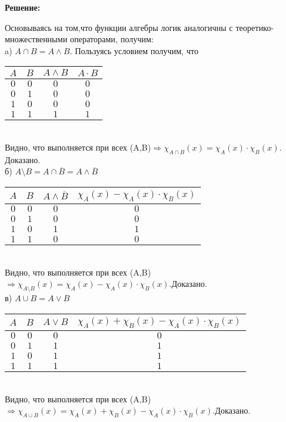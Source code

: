 \documentclass[a4paper,12pt]{article} %
\begin{document}
\begin{center}
\bfseries
{\Large Решение: }
\end{center}
Основываясь на том,что функции алгебры логик аналогичны с теоретико-множественными операторами, получим:\\
a) $A \cap B = A \wedge B.$ Пользуясь условием получим, что\\
\begin{tabular}{ | c | c | c | c |}
\hline
$A$ & $B$ & $A\wedge B$ & $A \cdot B$\\ \hline
$0$ & $0$ & $0$ & $0$\\
$0$ & $1$ & $0$ & $0$\\
$1$ & $0$ & $0$ & $0$\\
$1$ & $1$ & $1$ & $1$\\
\hline 
\end{tabular}\\
Видно, что выполняется при всех (A,B)$ \Rightarrow \chi_{A\cap B}(x) = \chi_{A}(x) \cdot \chi_{B}(x)$. Доказано.\\
б) $A \setminus B = A \cap \overline{B} = A \wedge \overline{B}$\\
\begin{tabular}{ | c | c | c | c |}
\hline
$A$ & $B$ & $ A \wedge \overline{B}$ & $\chi_{A}(x) - \chi_{A}(x) \cdot \chi_{B}(x)$\\ \hline
$0$ & $0$ & $0$ & $0$\\
$0$ & $1$ & $0$ & $0$\\
$1$ & $0$ & $1$ & $1$\\
$1$ & $1$ & $0$ & $0$\\
\hline 
\end{tabular}\\
Видно, что выполняется при всех (A,B)$ \Rightarrow \chi_{A\setminus B}(x) = \chi_{A}(x) - \chi_{A}(x) \cdot \chi_{B}(x).$Доказано.\\
в) $A \cup B = A \vee B$\\
\begin{tabular}{ | c | c | c | c |}
\hline
$A$ & $B$ & $A \vee B$ & $\chi_A(x) + \chi_{B}(x) - \chi_{A}(x)\cdot \chi_{B} (x)$\\ \hline
$0$ & $0$ & $0$ & $0$\\
$0$ & $1$ & $1$ & $1$\\
$1$ & $0$ & $1$ & $1$\\
$1$ & $1$ & $1$ & $1$\\
\hline 
\end{tabular}\\
Видно, что выполняется при всех (A,B)$ \Rightarrow \chi_{A\cup B}(x) = \chi_A(x) + \chi_{B}(x) - \chi_{A}(x)\cdot \chi_{B} (x).$Доказано.\\
\end{document}
